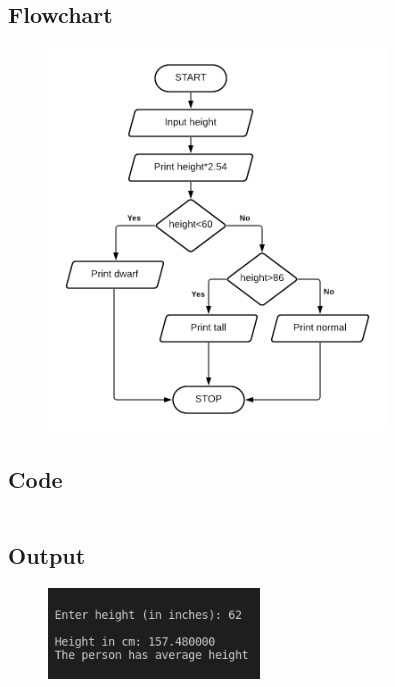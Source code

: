 \documentclass[12pt]{article}
\begin{document}
\section{}
\subsection{Flowchart}
\begin{figure}[h]
    \centering
    \includegraphics[width=0.8\textwidth]{Flowchart05.png}
\end{figure}
\newpage
\subsection{Code}
\inputminted{c}{q5.c}
\subsection{Output}
\begin{figure}[h]
    \centering
    \includegraphics[width=0.5\textwidth]{5.png}
\end{figure}
\newpage
\section{}
\end{document}
